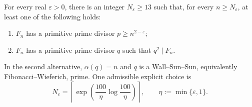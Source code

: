 \begin{theorem}
\label{thm:large-primitive-wieferich-alternative}
For every real $\varepsilon>0$, there is an integer
$N_\varepsilon\geq13$ such that, for every $n\geq N_\varepsilon$, at least
one of the following holds:
\begin{enumerate}[label=\textup{(\roman*)}]
\item $F_n$ has a primitive prime divisor $p\geq n^{2-\varepsilon}$;
\item $F_n$ has a primitive prime divisor $q$ such that $q^2\mid F_n$.
\end{enumerate}
In the second alternative, $\alpha(q)=n$ and $q$ is a Wall--Sun--Sun,
equivalently Fibonacci--Wieferich, prime.
One admissible explicit choice is
\begin{equation}
\label{eq:explicit-alternative-threshold}
 N_\varepsilon=
 \left\lceil
  \exp\!\left(\frac{100}{\eta}\log\frac{100}{\eta}\right)
 \right\rceil,
 \qquad \eta:=\min\{\varepsilon,1\}.
\end{equation}
\end{theorem}

